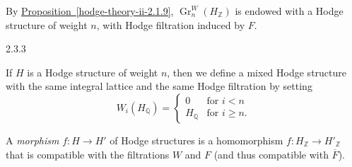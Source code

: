     By \hyperref[hodge-theory-ii-2.1.9]{Proposition~\ref*{hodge-theory-ii-2.1.9}}, \(\operatorname {Gr}_n^W(H_\mathbb {Z})\) is endowed with a Hodge structure of weight \(n\), with Hodge filtration induced by \(F\).\begin{example}{2.3.3}\label{hodge-theory-ii-2.3.3}\skipsinglepar\par{}If \(H\) is a Hodge structure of weight \(n\), then we define a mixed Hodge structure with the same integral lattice and the same Hodge filtration by setting
    \[       W_i(H_\mathbb {Q}) =       \begin {cases}         0 &\text {for } i<n     \\H_\mathbb {Q} &\text {for } i\geqslant  n.       \end {cases}     \]\end{example}\label{hodge-theory-ii-2.3.4}\par{}A \emph{morphism} \(f\colon  H\to  H'\) of Hodge structures is a homomorphism \(f\colon  H_\mathbb {Z}\to  H'_\mathbb {Z}\) that is compatible with the filtrations \(W\) and \(F\) (and thus compatible with \(\overline {F}\)).
